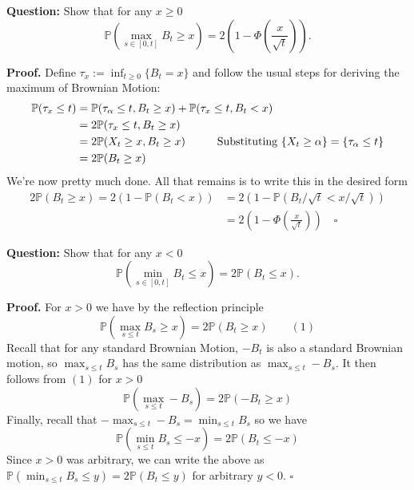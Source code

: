 \documentclass{article}
\begin{document}
\begin{tcolorbox}[colframe=black,colback=gray!5,boxrule=0.5pt]
\textbf{Question:} Show that for any $x\geq 0$ 
$$\mathbb{P}(\max_{s\in[0,t]} B_t\geq x) = 2\left(1- \Phi\left(\frac{x}{\sqrt{t}}\right)\right).$$
\end{tcolorbox}
\textbf{Proof.} Define $\tau_x := \inf_{t\geq0}\{B_t=x\}$ and follow the usual steps for deriving the maximum of Brownian Motion: 
\begin{align*}
    \mathbb{P}(\tau_x \leq t) &= \mathbb{P}(\tau_\alpha\leq t, B_t \geq x) + \mathbb{P}(\tau_x\leq t, B_t < x) \\
    &= 2\mathbb{P}(\tau_x\leq t, B_t \geq x) \\
    &= 2\mathbb{P}(X_t\geq x, B_t\geq x) \hspace{10mm}\text{{Substituting $\{X_t\geq\alpha\} = \{\tau_\alpha \leq t\}$}} \\
    &= 2\mathbb{P}(B_t\geq x) \\
\end{align*}
We're now pretty much done. All that remains is to write this in the desired form
\begin{align*}
    2\mathbb{P}(B_t\geq x) = 2(1 - \mathbb{P}(B_t <x))  &= 2(1 - \mathbb{P}(B_t/\sqrt{t} <x/\sqrt{t})) \\
    &= 2\left(1- \Phi\left(\frac{x}{\sqrt{t}}\right)\right) \quad\square
\end{align*}

\begin{tcolorbox}[colframe=black,colback=gray!5,boxrule=0.5pt]
\textbf{Question:} Show that for any $x<0$ 
$$\mathbb{P}(\min_{s\in[0,t]} B_t\leq x) = 2\mathbb{P}(B_t\leq x).$$
\end{tcolorbox}
\textbf{Proof.} For $x > 0$ we have by the reflection principle 
$$\mathbb{P}(\max_{s\leq t}B_s\geq x) = 2\mathbb{P}(B_t\geq x)\quad\quad (1)$$
Recall that for any standard Brownian Motion, $-B_t$ is also a standard Brownian motion, so $\max_{s\leq t}B_s$ has the same distribution as $\max_{s\leq t}-B_s$. It then follows from $(1)$ for $x>0$
$$\mathbb{P}(\max_{s\leq t}-B_s) = 2\mathbb{P}(-B_t\geq x)$$
Finally, recall that $-\max_{s\leq t} -B_s = \min_{s\leq t} B_s$ so we have 
$$\mathbb{P}(\min_{s\leq t}B_s\leq-x) = 2\mathbb{P}(B_t\leq -x)$$
Since $x>0$ was arbitrary, we can write the above as $\mathbb{P}(\min_{s\leq t}B_s\leq y) = 2\mathbb{P}(B_t\leq y)$ for arbitrary $y<0$. $\square$
\end{document}
